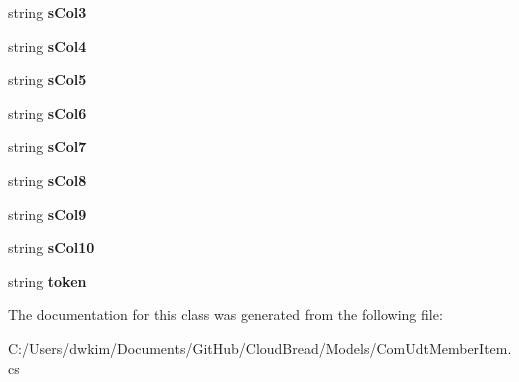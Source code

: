\begin{DoxyCompactItemize}
\item 
string {\bfseries s\+Col3}\hypertarget{a00072_a99158b5c393f1f81993c1891fe2fee32}{}\label{a00072_a99158b5c393f1f81993c1891fe2fee32}

\item 
string {\bfseries s\+Col4}\hypertarget{a00072_ad89fc64091c94cd45e6d74e8930ad55b}{}\label{a00072_ad89fc64091c94cd45e6d74e8930ad55b}

\item 
string {\bfseries s\+Col5}\hypertarget{a00072_a5f04b9ce3a43529a88852104029891b8}{}\label{a00072_a5f04b9ce3a43529a88852104029891b8}

\item 
string {\bfseries s\+Col6}\hypertarget{a00072_aa41650cfdcd34949212616a7c90c34bc}{}\label{a00072_aa41650cfdcd34949212616a7c90c34bc}

\item 
string {\bfseries s\+Col7}\hypertarget{a00072_a9390e4d1f6e11600187adff921793d3d}{}\label{a00072_a9390e4d1f6e11600187adff921793d3d}

\item 
string {\bfseries s\+Col8}\hypertarget{a00072_ade52f15f570af77312cea66401ffa1fd}{}\label{a00072_ade52f15f570af77312cea66401ffa1fd}

\item 
string {\bfseries s\+Col9}\hypertarget{a00072_af139eeeb5a9a17244a6cb6930c738d57}{}\label{a00072_af139eeeb5a9a17244a6cb6930c738d57}

\item 
string {\bfseries s\+Col10}\hypertarget{a00072_a8ed24cb95fb1ff0527aba5571c50d2b3}{}\label{a00072_a8ed24cb95fb1ff0527aba5571c50d2b3}

\item 
string {\bfseries token}\hypertarget{a00072_a41ca4ddd66c8481e42853cbc47f6f49f}{}\label{a00072_a41ca4ddd66c8481e42853cbc47f6f49f}

\end{DoxyCompactItemize}


The documentation for this class was generated from the following file\+:\begin{DoxyCompactItemize}
\item 
C\+:/\+Users/dwkim/\+Documents/\+Git\+Hub/\+Cloud\+Bread/\+Models/Com\+Udt\+Member\+Item.\+cs\end{DoxyCompactItemize}
